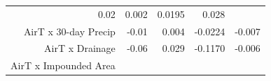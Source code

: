 \begin{longtable}[c]{@{}rrrrr@{}}
\begin{minipage}[t]{0.08\columnwidth}\raggedleft\strut
0.02
\strut\end{minipage} &
\begin{minipage}[t]{0.07\columnwidth}\raggedleft\strut
0.002
\strut\end{minipage} &
\begin{minipage}[t]{0.10\columnwidth}\raggedleft\strut
0.0195
\strut\end{minipage} &
\begin{minipage}[t]{0.10\columnwidth}\raggedleft\strut
0.028
\strut\end{minipage}\tabularnewline
\begin{minipage}[t]{0.37\columnwidth}\raggedleft\strut
AirT x 30-day Precip
\strut\end{minipage} &
\begin{minipage}[t]{0.08\columnwidth}\raggedleft\strut
-0.01
\strut\end{minipage} &
\begin{minipage}[t]{0.07\columnwidth}\raggedleft\strut
0.004
\strut\end{minipage} &
\begin{minipage}[t]{0.10\columnwidth}\raggedleft\strut
-0.0224
\strut\end{minipage} &
\begin{minipage}[t]{0.10\columnwidth}\raggedleft\strut
-0.007
\strut\end{minipage}\tabularnewline
\begin{minipage}[t]{0.37\columnwidth}\raggedleft\strut
AirT x Drainage
\strut\end{minipage} &
\begin{minipage}[t]{0.08\columnwidth}\raggedleft\strut
-0.06
\strut\end{minipage} &
\begin{minipage}[t]{0.07\columnwidth}\raggedleft\strut
0.029
\strut\end{minipage} &
\begin{minipage}[t]{0.10\columnwidth}\raggedleft\strut
-0.1170
\strut\end{minipage} &
\begin{minipage}[t]{0.10\columnwidth}\raggedleft\strut
-0.006
\strut\end{minipage}\tabularnewline
\begin{minipage}[t]{0.37\columnwidth}\raggedleft\strut
AirT x Impounded Area
\strut\end{minipage} &
\begin{minipage}[t]{0.08\columnwidth}\raggedleft\strut

\end{minipage}
\end{longtable}
